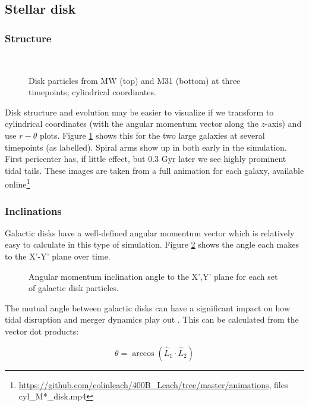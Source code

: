 \documentclass[twocolumn]{aastex63}
\newcommand{\todo}{\color{red}{TODO}\color{black}\hspace{2mm}}
\begin{document}
\subsection{Stellar disk}

\subsubsection{Structure}

\todo{identify the bar?}\ 

\todo{more on spiral arms}


\begin{figure}[!bht!]
	\caption{Disk particles from MW (top) and M31 (bottom) at three timepoints; cylindrical coordinates.
		\label{fig:6cyl}}
\end{figure}

Disk structure and evolution may be easier to visualize if we transform to cylindrical coordinates (with the angular momentum vector along the $z$-axis) and use $r-\theta$ plots. Figure \ref{fig:6cyl} shows this for the two large galaxies at several timepoints (as labelled).  Spiral arms show up in both early in the simulation. First pericenter has, if little effect, but 0.3 Gyr later we see highly prominent tidal tails. These images are taken from a full animation for each galaxy, available online\footnote{\url{https://github.com/colinleach/400B_Leach/tree/master/animations}, files cyl\_M*\_disk.mp4 }

\subsubsection{Inclinations}

Galactic disks have a well-defined angular momentum vector which is relatively easy to calculate in this type of simulation. Figure \ref{fig:inclinations_xy} shows the angle each makes to the X'-Y' plane over time.

\begin{figure}[ht!]
	\caption{Angular momentum inclination angle to the X',Y' plane for each set of galactic disk particles.
		\label{fig:inclinations_xy}}
\end{figure}

The mutual angle between galactic disks can have a significant impact on how tidal disruption and merger dynamics play out \todo{ref?}. This can be calculated from the vector dot products:

\[ \theta = \arccos (\hat{L}_1 \cdot \hat{L}_2 ) \]
\end{document}
